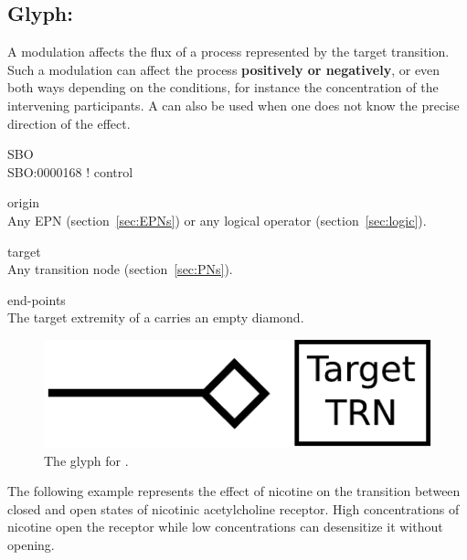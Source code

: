 \subsection{Glyph: }\label{sec:modulation}

A modulation affects the flux of a process
represented by the target transition. Such a modulation can affect the
process \textbf{positively or negatively}, or even both ways depending on the
conditions, for instance the concentration of the intervening
participants. A  can also be used when one does not know the precise direction of the effect.

\begin{glyphDescription}
 \item[SBO]\mbox{}\\ SBO:0000168 ! control
 \item[origin]\mbox{}\\ Any EPN (section~\ref{sec:EPNs}) or any logical operator (section~\ref{sec:logic}).
 \item[target]\mbox{}\\ Any transition node (section~\ref{sec:PNs}).
 \item[end-points]\mbox{}\\ The target extremity of a  carries an empty diamond.
 \end{glyphDescription}

\begin{figure}[H]
  \centering
  \includegraphics[scale = 0.5]{images/modulation}
  \caption{The \PD glyph for .}
  \label{fig:modulation}
\end{figure}

The following example represents the effect of nicotine on the transition between closed and open states of nicotinic acetylcholine receptor. High concentrations of nicotine open the receptor while low concentrations can desensitize it without opening. 

